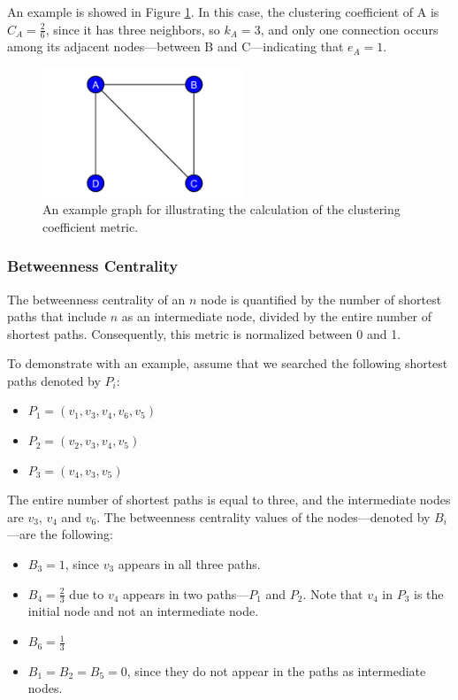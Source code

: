 An example is showed in Figure \ref{fig:clustering}. In this case, the clustering coefficient of \textsf{A} is $C_A = \frac{2}{6}$, since it has three neighbors, so $k_A = 3$, and only one connection occurs among its adjacent nodes---between \textsf{B} and \textsf{C}---indicating that $e_A = 1$.
\begin{figure}[!ht]
	\centering
	\includegraphics[width=60mm, keepaspectratio]{figures/clustering.pdf}
	\caption{An example graph for illustrating the calculation of the clustering coefficient metric.}
	\label{fig:clustering}
\end{figure}

\subsubsection{Betweenness Centrality}

The betweenness centrality of an $n$ node is quantified by the number of shortest paths that include $n$ as an intermediate node, divided by the entire number of shortest paths. Consequently, this metric is normalized between 0 and 1.

To demonstrate with an example, assume that we searched the following shortest paths denoted by $P_i$:
\begin{itemize}
	\item $P_1 = (v_1, v_3, v_4, v_6, v_5)$
	\item $P_2 = (v_2, v_3, v_4, v_5)$
	\item $P_3 = (v_4, v_3, v_5)$
\end{itemize}

The entire number of shortest paths is equal to three, and the intermediate nodes are $v_3$, $v_4$ and $v_6$. The betweenness centrality values of the nodes---denoted by $B_i$---are the following:
\begin{itemize}
	\item $B_3 = 1$, since $v_3$ appears in all three paths.
	\item $B_4 = \frac{2}{3}$ due to $v_4$ appears in two paths---$P_1$ and $P_2$. Note that $v_4$ in $P_3$ is the initial node and not an intermediate node.
	\item $B_6 = \frac{1}{3}$
	\item $B_1 = B_2 = B_5 = 0$, since they do not appear in the paths as intermediate nodes.
\end{itemize}
